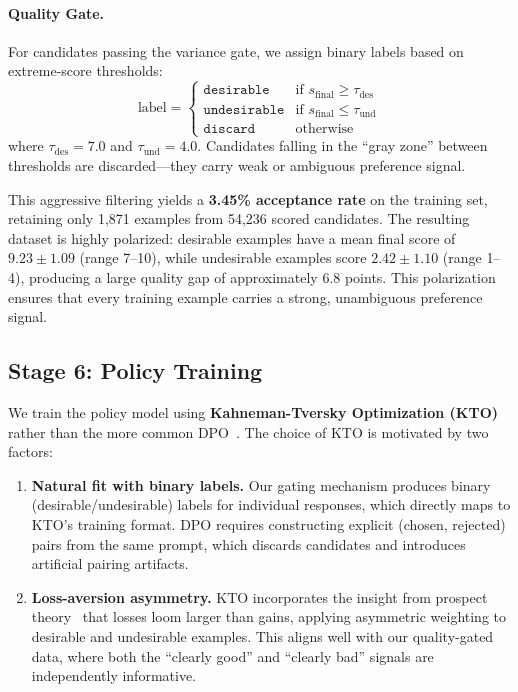 \documentclass[10pt,twocolumn]{article}
\begin{document}
\paragraph{Quality Gate.}
For candidates passing the variance gate, we assign binary labels based on extreme-score thresholds:
\begin{equation}
  \text{label} =
  \begin{cases}
    \texttt{desirable}   & \text{if } s_{\text{final}} \geq \tau_{\text{des}} \\
    \texttt{undesirable} & \text{if } s_{\text{final}} \leq \tau_{\text{und}} \\
    \texttt{discard}     & \text{otherwise}
  \end{cases}
  \label{eq:gating}
\end{equation}
where $\tau_{\text{des}}{=}7.0$ and $\tau_{\text{und}}{=}4.0$.
Candidates falling in the ``gray zone'' between thresholds are discarded---they carry weak or ambiguous preference signal.

This aggressive filtering yields a \textbf{3.45\% acceptance rate} on the training set, retaining only 1{,}871 examples from 54{,}236 scored candidates.
The resulting dataset is highly polarized: desirable examples have a mean final score of $9.23 \pm 1.09$ (range 7--10), while undesirable examples score $2.42 \pm 1.10$ (range 1--4), producing a large quality gap of approximately 6.8 points.
This polarization ensures that every training example carries a strong, unambiguous preference signal.


\subsection{Stage 6: Policy Training}
\label{sec:training}

We train the policy model using \textbf{Kahneman-Tversky Optimization (KTO)}~\cite{ethayarajh2024kto} rather than the more common DPO~\cite{rafailov2023dpo}.
The choice of KTO is motivated by two factors:
\begin{enumerate}[leftmargin=*,itemsep=1pt,topsep=2pt]
  \item \textbf{Natural fit with binary labels.} Our gating mechanism produces binary (desirable/undesirable) labels for individual responses, which directly maps to KTO's training format. DPO requires constructing explicit (chosen, rejected) pairs from the same prompt, which discards candidates and introduces artificial pairing artifacts.
  \item \textbf{Loss-aversion asymmetry.} KTO incorporates the insight from prospect theory~\cite{kahneman1979prospect} that losses loom larger than gains, applying asymmetric weighting to desirable and undesirable examples. This aligns well with our quality-gated data, where both the ``clearly good'' and ``clearly bad'' signals are independently informative.
\end{enumerate}
\end{document}
